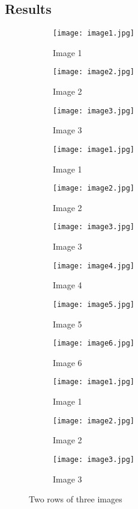 \documentclass[12pt]{article}
\begin{document}
	\subsection{Results}
	\begin{figure}[h]
		\centering
		\begin{subfigure}{0.3\textwidth}
			\texttt{[image: image1.jpg]}
			\caption{Image 1}
		\end{subfigure}
		\begin{subfigure}{0.3\textwidth}
			\texttt{[image: image2.jpg]}
			\caption{Image 2}
		\end{subfigure}
		\begin{subfigure}{0.3\textwidth}
			\texttt{[image: image3.jpg]}
			\caption{Image 3}
		\end{subfigure}
		\begin{subfigure}{0.3\textwidth}
			\texttt{[image: image1.jpg]}
			\caption{Image 1}
		\end{subfigure}
		\begin{subfigure}{0.3\textwidth}
			\texttt{[image: image2.jpg]}
			\caption{Image 2}
		\end{subfigure}
		\begin{subfigure}{0.3\textwidth}
			\texttt{[image: image3.jpg]}
			\caption{Image 3}
		\end{subfigure}
		
		\begin{subfigure}{0.3\textwidth}
			\texttt{[image: image4.jpg]}
			\caption{Image 4}
		\end{subfigure}
		\begin{subfigure}{0.3\textwidth}
			\texttt{[image: image5.jpg]}
			\caption{Image 5}
		\end{subfigure}
		\begin{subfigure}{0.3\textwidth}
			\texttt{[image: image6.jpg]}
			\caption{Image 6}
		\end{subfigure}
		\begin{subfigure}{0.3\textwidth}
			\texttt{[image: image1.jpg]}
			\caption{Image 1}
		\end{subfigure}
		\begin{subfigure}{0.3\textwidth}
			\texttt{[image: image2.jpg]}
			\caption{Image 2}
		\end{subfigure}
		\begin{subfigure}{0.3\textwidth}
			\texttt{[image: image3.jpg]}
			\caption{Image 3}
		\end{subfigure}
		
		\caption{Two rows of three images}
	\end{figure}
	
\end{document}
